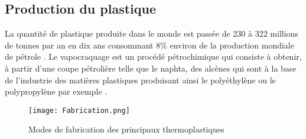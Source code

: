 \subsection{Production du plastique}
\par{
La  quantit\'e  de  plastique  produite  dans  le  monde  est  pass\'ee de 230 \`a 322 millions de tonnes par an en dix ans {\citep{Plasticseurope}} consommant 8\% environ de la production mondiale de p\'etrole {\citep{Planetoscope}}. Le vapocraquage est un proc\'ed\'e p\'etrochimique qui consiste \`a obtenir, \`a partir d'une coupe p\'etroli\`ere telle que le naphta, des alc\`enes qui sont \`a la base de l'industrie des mati\`eres plastiques produisant ainsi le poly\'ethyl\`ene ou le polypropyl\`ene par exemple {\citep{Europetrole}}.
}

\begin{figure}[h]
\centering
\texttt{[image: Fabrication.png]}
\caption{Modes de fabrication des principaux thermoplastiques {\citep{SCF}}} 
\label{fabrication}
\end{figure}
\FloatBarrier
